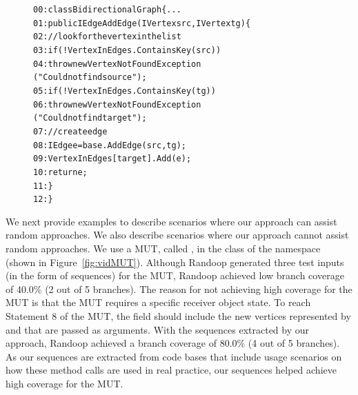 \documentclass{sig-alternate}
\begin{document}
\begin{figure}[t]
\begin{CodeOut}
\begin{alltt}
00:class BidirectionalGraph \{ ...
01:\hspace*{0.1in}public IEdge AddEdge(IVertex src, IVertex tg) \{
02:\hspace*{0.2in}// look for the vertex in the list
03:\hspace*{0.2in}if (!VertexInEdges.ContainsKey(src))
04:\hspace*{0.3in}throw new VertexNotFoundException 
\hspace*{0.5in}("Could not find source");
05:\hspace*{0.2in}if (!VertexInEdges.ContainsKey(tg))
06:\hspace*{0.3in}throw new VertexNotFoundException 
\hspace*{0.5in}("Could not find target");
07:\hspace*{0.2in}// create edge
08:\hspace*{0.2in}IEdge e = base.AddEdge(src, tg);
09:\hspace*{0.2in}VertexInEdges[target].Add(e);
10:\hspace*{0.2in}return e;
11:\hspace*{0.1in}\}
12:\}
\end{alltt}
\end{CodeOut} \vspace*{-5ex}
 \vspace*{-5ex}
\end{figure}

We next provide examples to describe scenarios where our approach can assist random approaches. We also describe scenarios where our approach cannot assist random approaches. We use a MUT, called , in the  class of the  namespace (shown in Figure~\ref{fig:vidMUT}). Although Randoop generated three test inputs (in the form of sequences) for the  MUT, Randoop achieved low branch coverage of 40.0\% (2 out of 5 branches). The reason for not achieving high coverage for the  MUT is that the  MUT requires a specific receiver object state. To reach Statement 8 of the MUT, the  field should include the new vertices represented by  and  that are passed as arguments. With the sequences extracted by our approach, Randoop achieved a branch coverage of 80.0\% (4 out of 5 branches). As our sequences are extracted from code bases that include usage scenarios on how these method calls are used in real practice, our sequences helped achieve high coverage for the  MUT. 
\end{document}
